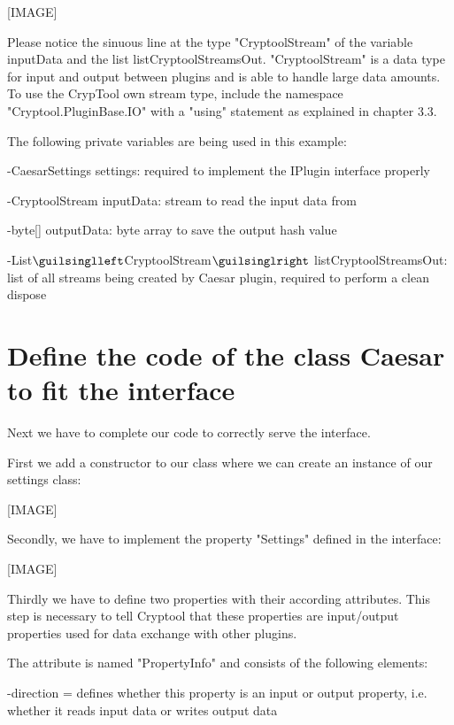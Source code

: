 [IMAGE]

Please notice the sinuous line at the type "CryptoolStream" of the variable inputData and the list listCryptoolStreamsOut. "CryptoolStream" is a data type for input and output between plugins and is able to handle large data amounts. To use the CrypTool own stream type, include the namespace "Cryptool.PluginBase.IO" with a "using" statement as explained in chapter 3.3.

The following private variables are being used in this example:

\hspace{20pt}-CaesarSettings settings: required to implement the IPlugin interface properly

\hspace{20pt}-CryptoolStream inputData: stream to read the input data from

\hspace{20pt}-byte[] outputData: byte array to save the output hash value

\hspace{20pt}-List$\guilsinglleft$CryptoolStream$\guilsinglright$ listCryptoolStreamsOut: list of all streams being created by Caesar plugin, required to perform a clean dispose


\section{Define the code of the class Caesar to fit the interface}\label{sec:DefineTheCodeOfTheClassMD5ToFitTheInterface}
Next we have to complete our code to correctly serve the interface.

First we add a constructor to our class where we can create an instance of our settings class:

[IMAGE]

Secondly, we have to implement the property "Settings" defined in the interface:

[IMAGE]

Thirdly we have to define two properties with their according attributes. This step is necessary to tell Cryptool that these properties are input/output properties used for data exchange with other plugins.

The attribute is named "PropertyInfo" and consists of the following elements:

\hspace{20pt}-direction = defines whether this property is an input or output property, i.e. whether it reads input data or writes output data

